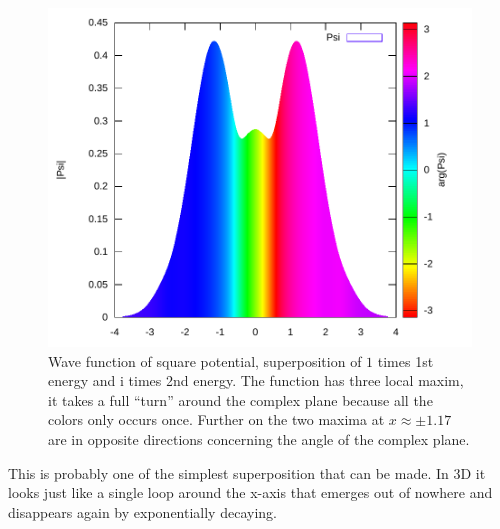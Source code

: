 \documentclass[11pt,DIV=10,final]{scrreprt} %
\newcommand{\mi}{{\text{i}}}
\begin{document}
\begin{minipage}{\textwidth}
\begin{figure}[H]
\centering
\includegraphics[width=\textwidth]{plots/super-square-1_1-2_i.pdf}
\caption{\label{fig:label} Wave function of square potential, superposition of $1$ times 1st energy and $\mi$ times 2nd energy. The function has three local maxim, it takes a full ``turn'' around
    the complex plane because all the colors only occurs once. Further on the two maxima at $x \approx \pm 1.17$ are in opposite directions concerning the angle of the complex plane.}
\end{figure}
This is probably one of the simplest superposition that can be made. In 3D it looks just like a single loop around the x-axis that emerges out of nowhere and disappears again by exponentially decaying.
\end{minipage}
\end{document}
